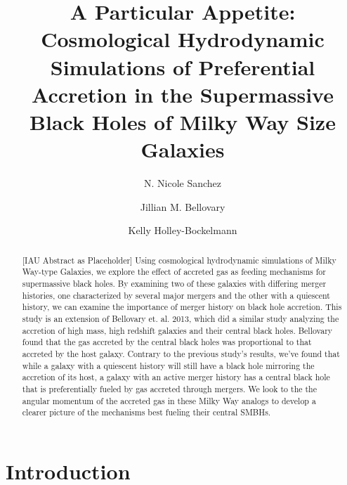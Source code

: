 \documentclass[manuscript]{aastex}
\begin{document}
 

\title{A Particular Appetite: Cosmological Hydrodynamic Simulations of Preferential Accretion in the Supermassive Black Holes of Milky Way Size Galaxies}



\author{N. Nicole Sanchez }
\author{Jillian M. Bellovary}
\author{Kelly Holley-Bockelmann}



\begin{abstract}\label{abs:abstractlabel}

[IAU Abstract as Placeholder] Using cosmological hydrodynamic simulations of Milky Way-type Galaxies, we explore the effect of accreted gas as feeding mechanisms for supermassive black holes. By examining two of these galaxies with differing merger histories, one characterized by several major mergers and the other with a quiescent history, we can examine the importance of merger history on black hole accretion. This study is an extension of Bellovary et. al. 2013, which did a similar study analyzing the accretion of high mass, high redshift galaxies and their central black holes. Bellovary found that the gas accreted by the central black holes was proportional to that accreted by the host galaxy. Contrary to the previous study's results, we've found that while a galaxy with a quiescent history will still have a black hole mirroring the accretion of its host, a galaxy with an active merger history has a central black hole that is preferentially fueled by gas accreted through mergers. We look to the the angular momentum of the accreted gas in these Milky Way analogs to develop a clearer picture of the mechanisms best fueling their central SMBHs.

\end{abstract}


\section{Introduction}\label{sec-intro}

\end{document}
